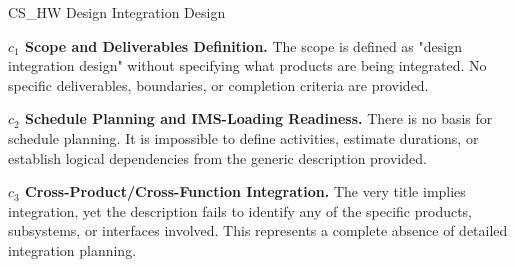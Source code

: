 %
\begin{frame}{CS\_HW Design Integration Design}
\begin{minipage}{0.90\textwidth}
\raggedright
\fontsize{8}{9.5}\selectfont
\textbf{\(c_1\) Scope and Deliverables Definition.}
The scope is defined as "design integration design" without specifying what products are being integrated. No specific deliverables, boundaries, or completion criteria are provided.\par\vspace{0.6em}
\textbf{\(c_2\) Schedule Planning and IMS-Loading Readiness.}
There is no basis for schedule planning. It is impossible to define activities, estimate durations, or establish logical dependencies from the generic description provided.\par\vspace{0.6em}
\textbf{\(c_3\) Cross-Product/Cross-Function Integration.}
The very title implies integration, yet the description fails to identify any of the specific products, subsystems, or interfaces involved. This represents a complete absence of detailed integration planning.\par\vspace{0.6em}
\end{minipage}
\end{frame}

\endinput
